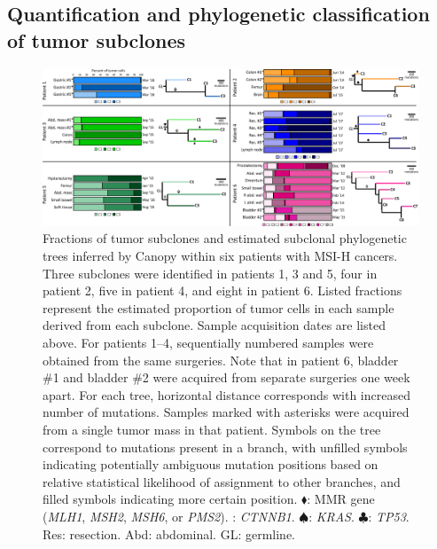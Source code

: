 \subsection{Quantification and phylogenetic classification of tumor subclones}
\label{ssec:msiclones:clone_results}
\begin{figure}[ht]
	\begin{center}
		\includegraphics[width=0.98\linewidth]{images/msiclones/canopy_results}
	\end{center}
	\vspace{-0.3cm}
	\caption[Fractions of tumor subclones and estimated subclonal phylogenetic trees within six patients with MSI-H cancers.]{Fractions of tumor subclones and estimated subclonal phylogenetic trees inferred by Canopy within six patients with MSI-H cancers. Three subclones were identified in patients 1, 3 and 5, four in patient 2, five in patient 4, and eight in patient 6. Listed fractions represent the estimated proportion of tumor cells in each sample derived from each subclone. Sample acquisition dates are listed above. For patients 1--4, sequentially numbered samples were obtained from the same surgeries. Note that in patient 6, bladder \#1 and bladder \#2 were acquired from separate surgeries one week apart. For each tree, horizontal distance corresponds with increased number of mutations. Samples marked with asterisks were acquired from a single tumor mass in that patient. Symbols on the tree correspond to mutations present in a branch, with unfilled symbols indicating potentially ambiguous mutation positions based on relative statistical likelihood of assignment to other branches, and filled symbols indicating more certain position. $\blacklozenge$: MMR gene (\textit{MLH1}, \textit{MSH2}, \textit{MSH6}, or \textit{PMS2}). {\large \ETX}: \textit{CTNNB1}. $\spadesuit$: \textit{KRAS}\@. $\clubsuit$: \textit{TP53}. Res: resection. Abd: abdominal. GL: germline.}
	\label{fig:msiclones:clonal_fracs}
\end{figure}

